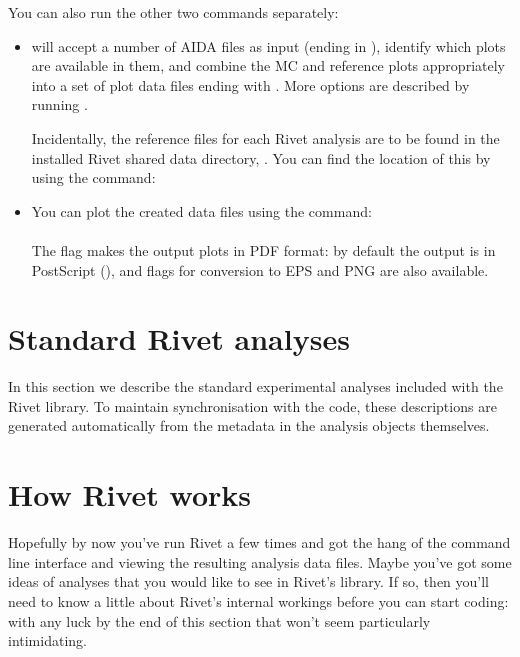 \documentclass{JHEP3}
\begin{document}
You can also run the other two commands separately:
%
\begin{itemize}
\item {} will accept a number of AIDA files as input (ending in
), identify which plots are available in them, and combine the MC
and reference plots appropriately into a set of plot data files ending with
. More options are described by running .

Incidentally, the reference files for each Rivet analysis are to be found in the
installed Rivet shared data directory, . You
can find the location of this by using the  command:\\

\item You can plot the created data files using the  command:\\
\\
The  flag makes the output plots in PDF format: by default the output
is in PostScript (), and flags for conversion to EPS and PNG are also
available.
\end{itemize}




\cleardoublepage
\part{Standard Rivet analyses}
\label{part:analyses}


In this section we describe the standard experimental analyses included with the
Rivet library. To maintain synchronisation with the code, these descriptions are
generated automatically from the metadata in the analysis objects
themselves.





\cleardoublepage
\part{How Rivet works}
\label{part:writinganalyses}

Hopefully by now you've run Rivet a few times and got the hang of the command
line interface and viewing the resulting analysis data files. Maybe you've got
some ideas of analyses that you would like to see in Rivet's library. If so,
then you'll need to know a little about Rivet's internal workings before you can
start coding: with any luck by the end of this section that won't seem
particularly intimidating.
\end{document}

